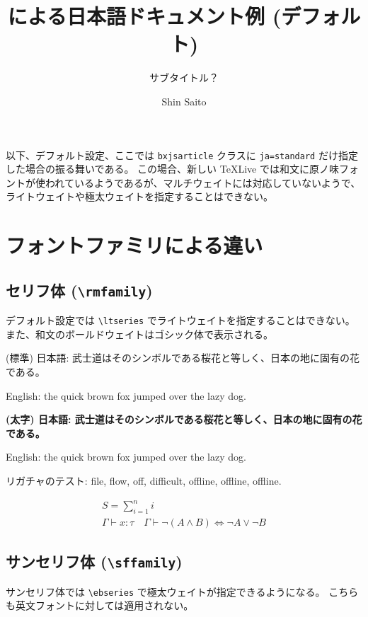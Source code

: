 \documentclass[xelatex,a4paper,ja=standard]{bxjsarticle}
\title{\XeLaTeX による日本語ドキュメント例 (デフォルト)}
\subtitle{サブタイトル？}
\author{Shin Saito}
\newcommand{\jasample}{武士道はそのシンボルである桜花と等しく、日本の地に固有の花である。}
\begin{document}
\maketitle

以下、デフォルト設定、ここでは \texttt{bxjsarticle} クラスに \texttt{ja=standard} だけ指定した場合の振る舞いである。
この場合、新しい TeXLive では和文に原ノ味フォントが使われているようであるが、マルチウェイトには対応していないようで、ライトウェイトや極太ウェイトを指定することはできない。

\section{フォントファミリによる違い}

\subsection{セリフ体 (\texttt{\textbackslash rmfamily})}

デフォルト設定では \texttt{\textbackslash ltseries} でライトウェイトを指定することはできない。
また、和文のボールドウェイトはゴシック体で表示される。

\rmfamily\LARGE



{\mdseries (標準) 日本語: \jasample

English: the quick brown fox jumped over the lazy dog.}

{\bfseries (太字) 日本語: \jasample

English: the quick brown fox jumped over the lazy dog.}

{\mdseries リガチャのテスト: file, flow, off, difficult, offline, off\/line, off\textcompwordmark line.}
 
\normalsize
\begin{gather*}
    S = \sum_{i=1}^n i \\
    \Gamma \vdash x \colon \tau \quad \Gamma \vdash {\neg(A\land B)} \iff {\neg A} \lor {\neg B}
\end{gather*}

\subsection{サンセリフ体 (\texttt{\textbackslash sffamily})}

サンセリフ体では \texttt{\textbackslash ebseries} で極太ウェイトが指定できるようになる。
こちらも英文フォントに対しては適用されない。
\end{document}
